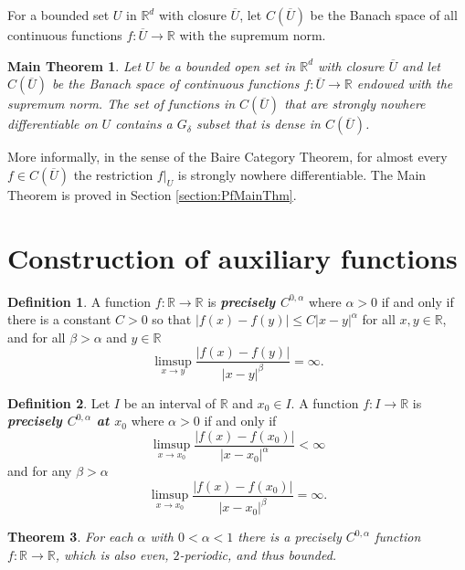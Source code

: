\documentclass[12pt]{amsart}
\newcommand{\adj}{{precisely }} %
\numberwithin{equation}{section}
\newcommand{\bi}[1]{{\boldmath\textbf{\itshape{#1}}}} %
\newcommand{\R}{{\mathbb R}}		%
\newcommand{\cn}{\colon}                %
\newtheorem{thm}{Theorem}[section]
\newtheorem*{introthm}{Main Theorem}
\theoremstyle{definition}
\newtheorem{defn}[thm]{Definition}
\theoremstyle{remark}
\begin{document}
For a bounded 
set $U$ in $\R^d$ with closure $\overline U$, 
let $C(\overline U)$ be the
Banach space of all continuous functions
$f\cn \overline U\to \R$ %
with the supremum norm.  


\begin{introthm}
  Let $U$ be a bounded open set in $\R^d$ with closure $\overline U$
  and let $C(\overline{U})$ be the Banach space of
  continuous functions $f\cn \overline U\to \R$   
  endowed with the supremum norm.
    The set of functions in $C(\overline U)$
    that are strongly
    nowhere differentiable on $U$  contains a 
    $G_\delta$ subset that is dense in  $C(\overline U)$.
\end{introthm}


More informally, in the sense of the Baire Category Theorem, for
almost every $f\in C(\overline U)$ the restriction $f\big|_U$ is strongly
nowhere differentiable.
The Main Theorem is proved in Section \ref{section:PfMainThm}. 


\section{Construction of  auxiliary functions}     
\label{section:main_example}




\begin{defn}
  A function $f\cn \R \to \R$ is \bi{\adj $C^{0,\alpha}$} where
  $\alpha>0$
  if and only if 
  there is a constant $C>0$ so that 
  $|f(x)-f(y)| \le C|x-y|^\alpha$ for all $x,y\in \R$,
  and for all $\beta>\alpha$ and $y\in \R$
    $$
    \limsup_{x\to y} \frac{|f(x)- f(y)|}{|x-y|^\beta} = \infty.
    $$
\end{defn}

\begin{defn}
  Let $I$ be an interval of $\R$ and $x_0\in I$. 
  A function  $f \cn I \to \R$
  is \bi{\adj $C^{0,\alpha}$ at $x_0$} where $\alpha>0$
  if and only if 
        $$
        \limsup_{x\to x_0} \frac{|f(x) -f(x_0)|}{|x-x_0|^\alpha} < \infty
        $$
        and for any $\beta > \alpha$  
        \begin{equation} \label{eq:b-infty} 
        \limsup_{x\to x_0}  \frac{|f(x) -f(x_0)|}{|x-x_0|^\beta} = \infty.
    \end{equation} 
\end{defn}



\begin{thm}\label{thm:strict_fcn}
For each $\alpha$ with $0<\alpha< 1$ there
is a \adj $C^{0,\alpha}$ function $f\cn  \R \to \R$,
which is also  even,  $2$-periodic,  and thus   bounded.  
\end{thm}
\end{document}
